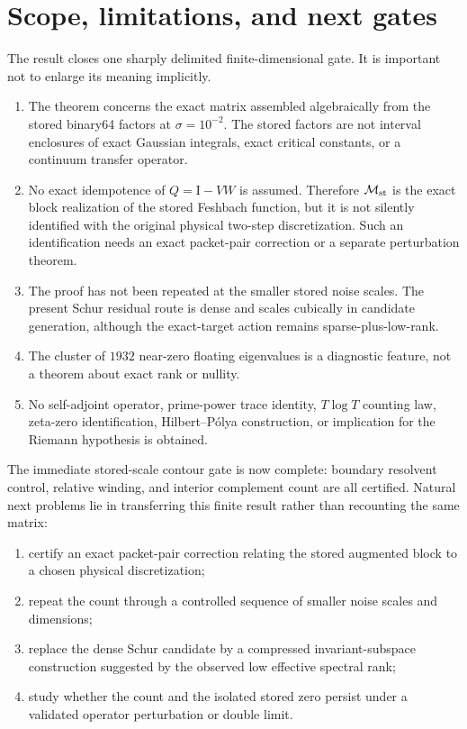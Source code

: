 \documentclass[11pt]{article}
\theoremstyle{definition}
\theoremstyle{remark}
\newcommand{\Id}{\mathrm I}
\newcommand{\Maug}{\mathcal M_{\rm st}}
\begin{document}
\section{Scope, limitations, and next gates}
\label{sec:limitations}

The result closes one sharply delimited finite-dimensional gate.  It is
important not to enlarge its meaning implicitly.

\begin{enumerate}
 \item The theorem concerns the exact matrix assembled algebraically from
       the stored binary64 factors at \(\sigma=10^{-2}\).  The stored
       factors are not interval enclosures of exact Gaussian integrals,
       exact critical constants, or a continuum transfer operator.
 \item No exact idempotence of \(Q=\Id-VW\) is assumed.  Therefore
       \(\Maug\) is the exact block realization of the stored Feshbach
       function, but it is not silently identified with the original
       physical two-step discretization.  Such an identification needs an
       exact packet-pair correction or a separate perturbation theorem.
 \item The proof has not been repeated at the smaller stored noise scales.
       The present Schur residual route is dense and scales cubically in
       candidate generation, although the exact-target action remains
       sparse-plus-low-rank.
 \item The cluster of \(1932\) near-zero floating eigenvalues is a
       diagnostic feature, not a theorem about exact rank or nullity.
 \item No self-adjoint operator, prime-power trace identity,
       \(T\log T\) counting law, zeta-zero identification,
       Hilbert--P\'olya construction, or implication for the Riemann
       hypothesis is obtained.
\end{enumerate}

The immediate stored-scale contour gate is now complete:
boundary resolvent control, relative winding, and interior complement count
are all certified.  Natural next problems lie in transferring this finite
result rather than recounting the same matrix:

\begin{enumerate}
 \item certify an exact packet-pair correction relating the stored augmented
       block to a chosen physical discretization;
 \item repeat the count through a controlled sequence of smaller noise
       scales and dimensions;
 \item replace the dense Schur candidate by a compressed invariant-subspace
       construction suggested by the observed low effective spectral rank;
 \item study whether the count and the isolated stored zero persist under
       a validated operator perturbation or double limit.
\end{enumerate}
\end{document}
